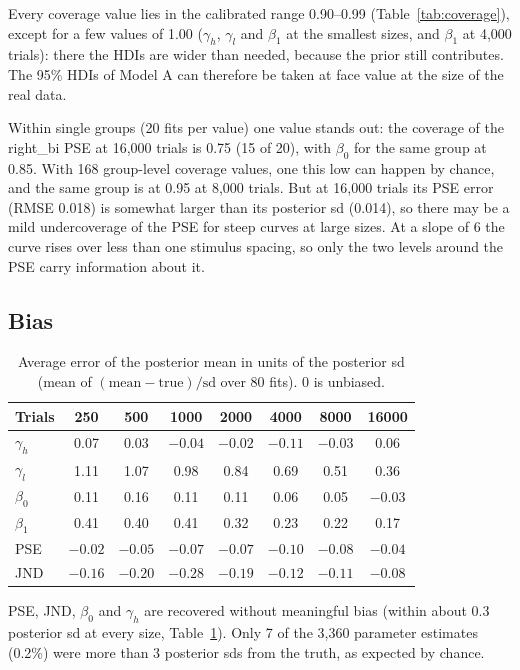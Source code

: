 \documentclass[11pt]{article}
\begin{document}
Every coverage value lies in the calibrated range 0.90--0.99
(Table~\ref{tab:coverage}), except for a few values of 1.00 ($\gamma_h$,
$\gamma_l$ and $\beta_1$ at the smallest sizes, and $\beta_1$ at 4{,}000
trials): there the HDIs are wider than needed, because the prior still
contributes. The 95\% HDIs of Model A can therefore be taken at face value
at the size of the real data.

Within single groups (20 fits per value) one value stands out: the coverage of
the right\_bi PSE at 16{,}000 trials is 0.75 (15 of 20), with $\beta_0$ for the
same group at 0.85. With 168 group-level coverage values, one this low can
happen by chance, and the same group is at 0.95 at 8{,}000 trials. But at
16{,}000 trials its PSE error (RMSE 0.018) is somewhat larger than its posterior
sd (0.014), so there may be a mild undercoverage of the PSE for steep curves at
large sizes. At a slope of 6 the curve rises over less than one stimulus spacing,
so only the two levels around the PSE carry information about it.

\subsection{Bias}
\label{sec:bias}

\begin{table}[H]
\centering
\caption{Average error of the posterior mean in units of the posterior sd
(mean of $(\text{mean} - \text{true})/\text{sd}$ over 80 fits). 0 is unbiased.}
\label{tab:bias}
\begin{tabular}{lccccccc}
\toprule
Trials & 250 & 500 & 1000 & 2000 & 4000 & 8000 & 16000 \\
\midrule
$\gamma_h$ & 0.07 & 0.03 & $-0.04$ & $-0.02$ & $-0.11$ & $-0.03$ & 0.06 \\
$\gamma_l$ & 1.11 & 1.07 & 0.98 & 0.84 & 0.69 & 0.51 & 0.36 \\
$\beta_0$  & 0.11 & 0.16 & 0.11 & 0.11 & 0.06 & 0.05 & $-0.03$ \\
$\beta_1$  & 0.41 & 0.40 & 0.41 & 0.32 & 0.23 & 0.22 & 0.17 \\
PSE        & $-0.02$ & $-0.05$ & $-0.07$ & $-0.07$ & $-0.10$ & $-0.08$ & $-0.04$ \\
JND        & $-0.16$ & $-0.20$ & $-0.28$ & $-0.19$ & $-0.12$ & $-0.11$ & $-0.08$ \\
\bottomrule
\end{tabular}
\end{table}

PSE, JND, $\beta_0$ and $\gamma_h$ are recovered without meaningful bias
(within about 0.3 posterior sd at every size, Table~\ref{tab:bias}). Only 7 of
the 3{,}360 parameter estimates (0.2\%) were more than 3 posterior sds from the
truth, as expected by chance.
\end{document}
